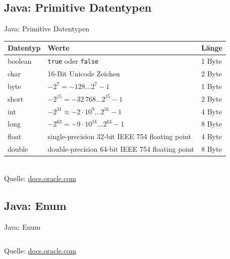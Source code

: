 \documentclass[usepdftitle=false,hyperref={pdfpagelabels=false}]{beamer}
\begin{document}
\subsection{Java: Primitive Datentypen}
\begin{frame}{Java: Primitive Datentypen}
    \begin{tabular}{l|l|l}
        Datentyp    & Werte                                             & Länge\\
        \hline
        \hline
        boolean     & \texttt{true} oder \texttt{false}                         & 1 Byte\\
        char        & 16-Bit Unicode Zeichen                            & 2 Byte\\
        \hline
        byte        & $-2^7 =-128 \dots 2^7-1$                          & 1 Byte\\
        short       & $-2^{15}=-32\,768 \dots 2^{15}-1$                 & 2 Byte\\
        int         & $-2^{31}\approx-2 \cdot 10^9 \dots 2^{31}-1$      & 4 Byte\\
        long        & $-2^{63}=-9\cdot 10^{18} \dots 2^{63}-1$          & 8 Byte\\
        \hline
        float       & single-precision 32-bit IEEE 754 floating point   & 4 Byte\\
        double      & double-precision 64-bit IEEE 754 floating point   & 8 Byte\\
    \end{tabular}
    \\
    Quelle: \href{http://docs.oracle.com/javase/tutorial/java/nutsandbolts/datatypes.html}{docs.oracle.com}
\end{frame}

\subsection{Java: Enum}
\begin{frame}{Java: Enum}
    \inputminted[linenos, numbersep=5pt, tabsize=4, frame=lines, label=Day.java]{java}{Day.java}
    Quelle: \href{http://docs.oracle.com/javase/tutorial/java/javaOO/enum.html}{docs.oracle.com}
    \inputminted[linenos, numbersep=5pt, tabsize=4, frame=lines, label=SomeClass.java]{java}{SomeClass.java}
\end{frame}
\end{document}
